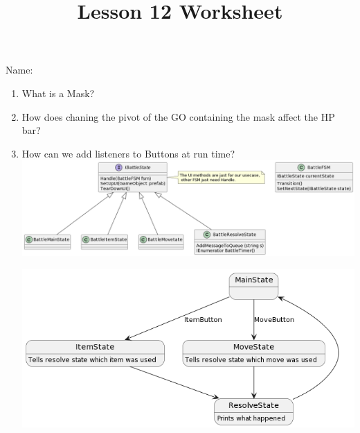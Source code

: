 \documentclass[12pt]{../rhitcsse}
\title{Lesson 12 Worksheet}
\begin{document}
\maketitle

\vspace*{0.15in}\hspace{0.25in}Name:\hrulefill\hspace{0.25in}\hspace{0.25in}

\begin{enumerate}
  \item What is a Mask?
  \vfill
  \item How does chaning the pivot of the GO containing the mask affect the HP bar?
  \vfill
  \item How can we add listeners to Buttons at run time?
  \vfill
  \clearpage
  \centering
  \includegraphics[width=\textwidth]{../figs/FSM_example_UML.png}

  \vspace*{1in}
  
  \includegraphics[width=\textwidth]{../figs/FSM_example.png}

\end{enumerate}
\end{document}
